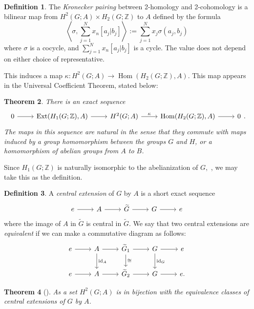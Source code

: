 \documentclass{amsart}
\newtheorem{theorem}{Theorem}[section]
\theoremstyle{definition}
\newtheorem{definition}[theorem]{Definition}
\newcommand{\Z}{\mathbb{Z}}
\DeclareMathOperator{\id}{id}
\DeclareMathOperator{\Ext}{Ext}
\DeclareMathOperator{\Hom}{Hom}
\begin{document}
\begin{definition}\label{kronecker pairing}
The {\em Kronecker pairing} between 2-homology and 2-cohomology is a bilinear map from $H^2(G;A)\times H_2(G;\Z)$ to $A$ defined by the formula
$$\left\langle\sigma,\sum_{j=1}^Nx_n[a_j|b_j]\right\rangle:=\sum_{j=1}^Nx_j\sigma(a_j,b_j)$$
where $\sigma$ is a cocycle, and $\sum_{j=1}^Nx_n[a_j|b_j]$ is a cycle. The value does not depend on either choice of representative.
\end{definition}

This induces a map $\kappa\colon H^2(G;A)\rightarrow  \Hom(H_2(G;\Z),A)$. This map appears in the Universal Coefficient Theorem, stated below:

\begin{theorem}\cite[Theorem 53.1]{eat}\label{UCT AT} There is an exact sequence
$$\begin{tikzcd}
0\arrow{r}{}&\Ext(H_1(G;\Z),A)\arrow{r}{}& H^2(G;A)\arrow{r}{\kappa}&\Hom(H_2(G;\Z),A)\arrow{r}{}&0
\end{tikzcd}.$$
The maps in this sequence are natural in the sense that they commute with maps induced by a group homomorphism between the groups $G$ and $H$, or a homomorphism of abelian groups from $A$ to $B$.
\end{theorem}

Since $H_1(G;\Z)$ is naturally isomorphic to the abelianization of $G$,~\cite[page 36]{coho}, we may take this as the definition.

\begin{definition}A {\em central extension} of $G$ by $A$ is a short exact sequence
$$\begin{tikzcd}
e\arrow{r} & A
\arrow{r}{} &
\widetilde{G} \arrow{r}{}
& G\arrow{r}{}& e
\end{tikzcd}$$
where the image of $A$ in $\widetilde{G}$ is central in $\widetilde{G}$. We say that two central extensions are {\em equivalent} if we can make a commutative diagram as follows:
$$\begin{tikzcd}
e\arrow{r} & A
\arrow{r}{}\arrow{d}{\id_A} &
\widetilde{G}_1\arrow{d}{\cong} \arrow{r}{}
& G\arrow{r}{}\arrow{d}{\id_G}& e
\\
e\arrow{r} & A
\arrow{r}{} &
\widetilde{G}_2 \arrow{r}{}
& G\arrow{r}{}& e.
\end{tikzcd}$$
\end{definition}

\begin{theorem}[{\cite[Theorem IV.3.12]{coho}}] As a set $H^2(G;A)$ is in bijection with the equivalence classes of central extensions of $G$ by $A$.
\end{theorem}
\end{document}
